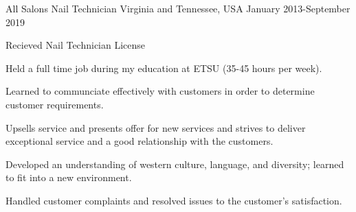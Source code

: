 

\begin{cventries}

  \cventry
    {All Salons} %
    {Nail Technician} %
    {Virginia and Tennessee, USA} %
    {January 2013-September 2019} %
    {
      \begin{cvitems} %
      \item Recieved Nail Technician License
      \item Held a full time job during my education at ETSU (35-45 hours per week).
      \item Learned to communciate effectively with customers in order to determine customer requirements.
      \item Upsells service and presents offer for new services and strives to deliver exceptional service and a good relationship with the customers.
      \item Developed an understanding of western culture, language, and diversity; learned to fit into a new environment.
      \item Handled customer complaints and resolved issues to the customer's satisfaction.
      \end{cvitems}
    }
\end{cventries}
